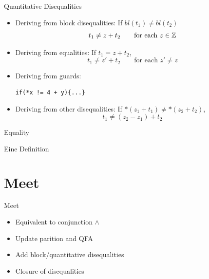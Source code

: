 \documentclass{beamer}
\begin{document}
\begin{frame}[containsverbatim]{Quantitative Disequalities}
    \begin{itemize}
        \item Deriving from block disequalities: If $bl(t_1) \neq bl(t_2)$
              \[
                  t_1\neq z+ t_2 \quad\quad \text{for each $z \in \mathbb{Z}$}
              \]
        \item Deriving from equalities: If $t_1 = z + t_2$,
              \[
                  t_1\neq z' + t_2 \quad\quad \text{for each $z' \neq z$}
              \]

        \item Deriving from guards:
              \begin{verbatim}
if(*x != 4 + y){...}
\end{verbatim}
        \item Deriving from other disequalities: If $*(z_1 + t_1) \neq *(z_2 + t_2)$,
              \[ t_1 \neq (z_2 - z_1) + t_2
              \]
    \end{itemize}
\end{frame}


\begin{frame}{Equality}
    \begin{Definition}
        Eine Definition
    \end{Definition}
\end{frame}

\section{Meet}
\begin{frame}{Meet}
    \begin{itemize}

        \item Equivalent to conjunction $\land$
        \item Update parition and QFA
        \item Add block/quantitative disequalities
        \item Closure of disequalities

    \end{itemize}
\end{frame}
\end{document}
